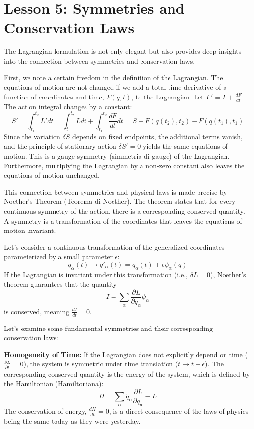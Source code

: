 \section*{Lesson 5: Symmetries and Conservation Laws}

The Lagrangian formulation is not only elegant but also provides deep insights into the connection between symmetries and conservation laws.

First, we note a certain freedom in the definition of the Lagrangian. The equations of motion are not changed if we add a total time derivative of a function of coordinates and time, $F(q, t)$, to the Lagrangian. Let $L' = L + \frac{dF}{dt}$. The action integral changes by a constant:
\[
    S' = \int_{t_1}^{t_2} L' dt = \int_{t_1}^{t_2} L dt + \int_{t_1}^{t_2} \frac{dF}{dt} dt = S + F(q(t_2), t_2) - F(q(t_1), t_1)
\]
Since the variation $\delta S$ depends on fixed endpoints, the additional terms vanish, and the principle of stationary action $\delta S' = 0$ yields the same equations of motion. This is a gauge symmetry (simmetria di gauge) of the Lagrangian. Furthermore, multiplying the Lagrangian by a non-zero constant also leaves the equations of motion unchanged.

This connection between symmetries and physical laws is made precise by Noether's Theorem (Teorema di Noether). The theorem states that for every continuous symmetry of the action, there is a corresponding conserved quantity. A symmetry is a transformation of the coordinates that leaves the equations of motion invariant.

Let's consider a continuous transformation of the generalized coordinates parameterized by a small parameter $\epsilon$:
\[
    q_\alpha(t) \to q'_\alpha(t) = q_\alpha(t) + \epsilon\psi_\alpha(q)
\]
If the Lagrangian is invariant under this transformation (i.e., $\delta L = 0$), Noether's theorem guarantees that the quantity
\[
    I = \sum_\alpha \frac{\partial L}{\partial\dot{q}_\alpha}\psi_\alpha
\]
is conserved, meaning $\frac{dI}{dt} = 0$.

Let's examine some fundamental symmetries and their corresponding conservation laws:

\textbf{Homogeneity of Time:} If the Lagrangian does not explicitly depend on time ($\frac{\partial L}{\partial t} = 0$), the system is symmetric under time translation ($t \to t + \epsilon$). The corresponding conserved quantity is the energy of the system, which is defined by the Hamiltonian (Hamiltoniana):
\[
    H = \sum_\alpha \dot{q}_\alpha\frac{\partial L}{\partial\dot{q}_\alpha} - L
\]
The conservation of energy, $\frac{dH}{dt} = 0$, is a direct consequence of the laws of physics being the same today as they were yesterday.

